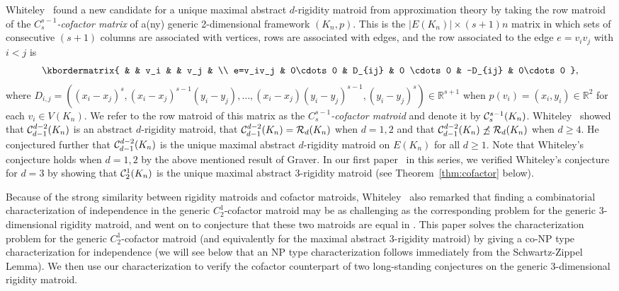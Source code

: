 \documentclass{daj}
\begin{document}
Whiteley~\cite{Wsurvey} found a new candidate for a unique maximal abstract $d$-rigidity matroid from approximation theory by taking the row matroid of the {\em $C^{s-1}_s$-cofactor matrix} of a(ny) generic 2-dimensional framework $(K_n,p)$. This is  the   $|E(K_n)|\times (s+1)n$ matrix in which sets of consecutive $(s+1)$ columns are associated with  vertices,  rows are associated with  edges,
and the row associated to the  edge $e=v_iv_j$ with $i<j$ is
\[
\kbordermatrix{
 & & v_i & & v_j & \\
 e=v_iv_j & 0\cdots 0 & D_{ij} & 0 \cdots 0 & -D_{ij} & 0\cdots 0
},
\]
where  $D_{i,j}=((x_i-x_j)^s, (x_i-x_j)^{s-1}(y_i-y_j),\dots, (x_i-x_j)(y_i-y_j)^{s-1}, (y_i-y_j)^s)\in \mathbb{R}^{s+1}$ when $p(v_i)=(x_i,y_i)\in \mathbb{R}^2$ for each $v_i\in V(K_n)$.
We refer to the row matroid  of this matrix as the {\em $C_s^{s-1}$-cofactor  matroid} and denote it by ${\cal C}_{s}^{s-1}(K_n)$. 
Whiteley~\cite{Wsurvey} showed that  ${\cal C}_{d-1}^{d-2}(K_n)$ is an %
abstract $d$-rigidity matroid, that   ${\cal C}_{d-1}^{d-2}(K_n)={\cal R}_{d}(K_n)$ 
when $d=1,2$ and that   ${\cal C}_{d-1}^{d-2}(K_n)\not\preceq {\cal R}_{d}(K_n)$ 
when $d\geq 4$. He conjectured further that  ${\cal C}_{d-1}^{d-2}(K_n)$  is the  unique  maximal abstract $d$-rigidity matroid on $E(K_n)$  for all $d\geq 1$. Note that Whiteley's conjecture holds when $d=1,2$ by the above mentioned result of Graver. In our first paper~\cite{CJT1} in this series, we verified Whiteley's conjecture for $d=3$ by showing that ${\cal C}_{2}^{1}(K_n)$  is the  unique maximal abstract $3$-rigidity matroid (see Theorem~\ref{thm:cofactor} below). 

Because of the strong similarity between rigidity matroids and cofactor matroids, Whiteley~\cite[page 55]{W90} also remarked that
finding a combinatorial characterization of 
independence in 
the generic $C_2^1$-cofactor  matroid may be
as challenging as the corresponding problem for the generic $3$-dimensional rigidity matroid, and went on to conjecture that these two matroids are equal in \cite[Conjecture 10.3.2]{Wsurvey}. 
This paper solves the characterization problem for the generic $C_2^1$-cofactor  matroid (and equivalently for the maximal abstract 3-rigidity matroid) by giving a co-NP type characterization for independence (we will see below that an NP type characterization follows immediately from the Schwartz-Zippel Lemma).
We then use our characterization to verify the cofactor counterpart of two long-standing conjectures on the generic 3-dimensional rigidity matroid. 
\end{document}
